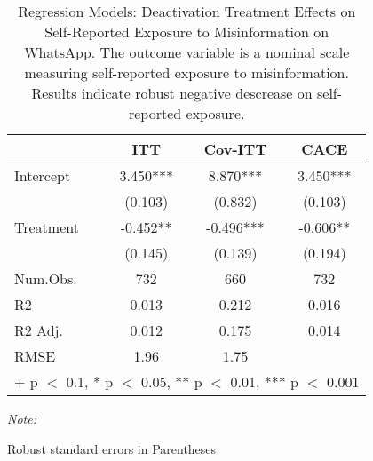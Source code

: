 \begin{table}

\caption{Regression Models: Deactivation Treatment Effects on Self-Reported Exposure to Misinformation on WhatsApp. The outcome variable is a nominal scale measuring self-reported exposure to misinformation. Results indicate robust negative descrease on self-reported exposure. }
\centering
\begin{threeparttable}
\begin{tabular}[t]{lccc}
\toprule
  & ITT & Cov-ITT & CACE\\
\midrule
Intercept & 3.450*** & 8.870*** & 3.450***\\
 & (0.103) & (0.832) & (0.103)\\
Treatment & -0.452** & -0.496*** & -0.606**\\
 & (0.145) & (0.139) & (0.194)\\
\midrule
Num.Obs. & 732 & 660 & 732\\
R2 & 0.013 & 0.212 & 0.016\\
R2 Adj. & 0.012 & 0.175 & 0.014\\
RMSE & 1.96 & 1.75 & \\
\bottomrule
\multicolumn{4}{l}{\rule{0pt}{1em}+ p $<$ 0.1, * p $<$ 0.05, ** p $<$ 0.01, *** p $<$ 0.001}\\
\end{tabular}
\begin{tablenotes}
\item \textit{Note: } 
\item Robust standard errors in Parentheses
\end{tablenotes}
\end{threeparttable}
\end{table}
